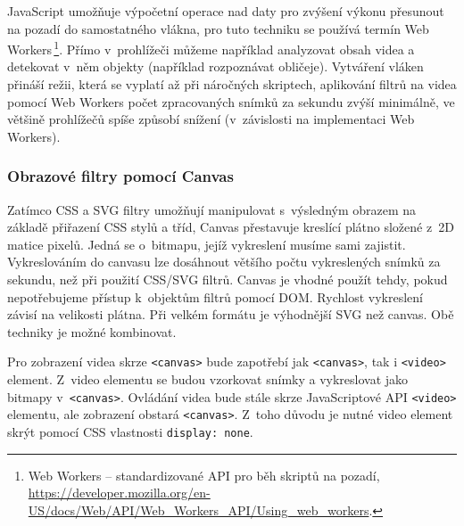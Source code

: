 JavaScript umožňuje výpočetní operace nad daty pro zvýšení výkonu přesunout na pozadí do samostatného vlákna, pro tuto techniku se používá termín Web Workers\,\footnote{Web Workers -- standardizované API pro běh skriptů na pozadí, \url{https://developer.mozilla.org/en-US/docs/Web/API/Web_Workers_API/Using_web_workers}.}. Přímo v~prohlížeči můžeme například analyzovat obsah videa a detekovat v~něm objekty (například rozpoznávat obličeje). Vytváření vláken přináší režii, která se vyplatí až při náročných skriptech, aplikování filtrů na videa pomocí Web Workers počet zpracovaných snímků za sekundu zvýší minimálně, ve většině prohlížečů spíše způsobí snížení (v~závislosti na implementaci Web Workers).

\subsubsection{Obrazové filtry pomocí Canvas}
Zatímco CSS a SVG filtry umožňují manipulovat s~výsledným obrazem na základě přiřazení CSS stylů a tříd, Canvas přestavuje kreslící plátno složené z~2D matice pixelů. Jedná se o~bitmapu, jejíž vykreslení musíme sami zajistit. Vykreslováním do canvasu lze dosáhnout většího počtu vykreslených snímků za sekundu, než při použití CSS/SVG filtrů. Canvas je vhodné použít tehdy, pokud nepotřebujeme přístup k~objektům filtrů pomocí DOM. Rychlost vykreslení závisí na velikosti plátna. Při velkém formátu je výhodnější SVG než canvas. Obě techniky je možné kombinovat.

Pro zobrazení videa skrze \texttt{<canvas>} bude zapotřebí jak \texttt{<canvas>}, tak i \texttt{<video>} element. Z~video elementu se budou vzorkovat snímky a vykreslovat jako bitmapy v~\texttt{<canvas>}. Ovládání videa bude stále skrze JavaScriptové API \texttt{<video>} elementu, ale zobrazení obstará \texttt{<canvas>}. Z~toho důvodu je nutné video element skrýt pomocí CSS vlastnosti \texttt{display: none}.

